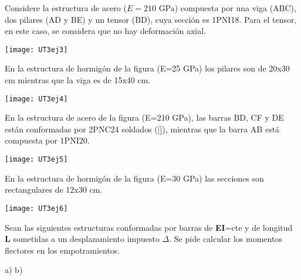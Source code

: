 \begin{center}
	\def\svgwidth{0.8\textwidth}
	
\end{center}




\ejercicio

Considere la estructura de acero ($E=210$ GPa) compuesta por una viga (ABC), dos pilares (AD y BE) y un tensor (BD), cuya sección es 1PNI18. Para el tensor, en este caso, se considera que no hay deformación axial.

\begin{center}
	\texttt{[image: UT3ej3]}
\end{center}



\ejercicio

En la estructura de hormigón de la figura (E=25 GPa) los pilares son de 20x30 cm mientras que la viga es de 15x40 cm. 

\begin{center}
	\texttt{[image: UT3ej4]}
\end{center}


\ejercicio

En la estructura de acero de la figura (E=210 GPa), las barras BD, CF y DE están conformadas por 2PNC24 soldados ([]), mientras que la barra AB está compuesta por 1PNI20. 


\begin{center}
	\texttt{[image: UT3ej5]}
\end{center}



\ejercicio 

En la estructura de hormigón de la figura (E=30 GPa) las secciones son rectangulares de 12x30 cm. 

\begin{center}
	\texttt{[image: UT3ej6]}
\end{center}


\ejercicio


Sean las siguientes estructuras conformadas por barras de \textbf{EI}=cte y de longitud \textbf{L} sometidas a un desplazamiento impuesto $\Delta$. Se pide calcular los momentos flectores en los empotramientos.


\begin{center}
	\def\svgwidth{0.45\textwidth}
	a) 
	\def\svgwidth{0.45\textwidth}
	b) 
\end{center}

